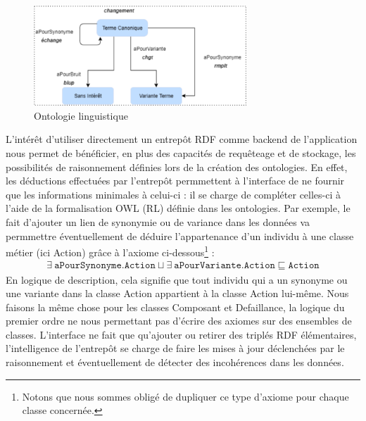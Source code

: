 \begin{figure}[tb]
    \begin{center}
        \includegraphics[width=8cm]{figures/ontLing}
    \end{center}
    \caption{Ontologie linguistique}\label{fig:ling}
\end{figure}



L'intérêt d'utiliser directement un entrepôt RDF comme backend de l'application nous permet de bénéficier, en plus des capacités de requêteage et de stockage, les possibilités de raisonnement définies lors de la création des ontologies. En effet, les déductions effectuées par l'entrepôt permmettent à l'interface de ne fournir que les informations minimales à celui-ci : il se charge de compléter celles-ci à l'aide de la formalisation OWL (RL)\cite{owlprofiles} définie dans les ontologies. Par exemple, le fait d'ajouter un lien de synonymie ou de variance dans les données va permmettre éventuellement de déduire l'appartenance d'un individu à une classe métier (ici Action) grâce à l'axiome ci-dessous\footnote{Notons que nous sommes obligé de dupliquer ce type d'axiome pour chaque classe concernée.
} :
$$
\begin{array}{ll}
\exists  \ \texttt{aPourSynonyme} .  \texttt {Action}  \sqcup \exists  \ \texttt{aPourVariante} .  \texttt {Action}
\sqsubseteq    \texttt{Action}
\end{array}
$$
En logique de description, cela signifie que tout individu qui a un synonyme ou une variante dans la classe Action appartient à la classe Action lui-même. Nous faisons la même chose pour les classes Composant et Defaillance, la logique du premier ordre ne nous permettant pas d'écrire des axiomes sur des ensembles de classes.
L'interface ne fait que qu'ajouter ou retirer des triplés RDF élémentaires, l'intelligence de l'entrepôt se charge de faire les mises à jour déclenchées par le raisonnement et éventuellement de détecter des incohérences dans les données.
